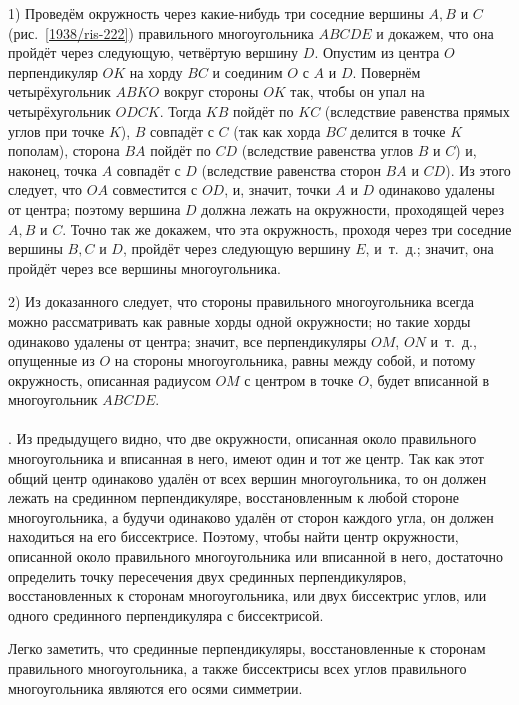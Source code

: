 1) Проведём окружность через какие-нибудь три соседние вершины $A, B$ и $C$ (рис.~\ref{1938/ris-222}) правильного многоугольника $ABCDE$ и докажем, что она пройдёт через следующую, четвёртую вершину $D$.
Опустим из центра $O$ перпендикуляр $OK$ на хорду $BC$ и соединим $O$ с $A$ и $D$.
Повернём четырёхугольник $ABKO$ вокруг стороны $OK$ так, чтобы он упал на четырёхугольник $ODCK$.
Тогда $KB$ пойдёт по $KC$ (вследствие равенства прямых углов при точке $K$), 
$B$ совпадёт с $C$ (так как хорда $BC$ делится в точке $K$ пополам), 
сторона $BA$ пойдёт по $CD$ (вследствие равенства углов $B$ и $C$)
и, наконец, точка $A$ совпадёт с $D$ (вследствие равенства сторон $BA$ и $CD$).
Из этого следует, что $OA$ совместится с $OD$, и, значит, точки $A$ и $D$ одинаково удалены от центра;
поэтому вершина $D$ должна лежать на окружности, проходящей через $A, B$ и $C$.
Точно так же докажем, что эта окружность, проходя через три соседние вершины $B, C$ и $D$, пройдёт через следующую вершину $E$, и~т.~д.;
значит, она пройдёт через все вершины многоугольника.

2) Из доказанного следует, что стороны правильного многоугольника всегда можно рассматривать как равные хорды одной окружности;
но такие хорды одинаково удалены от центра;
значит, все перпендикуляры $OM$, $ON$ и~т.~д., опущенные из $O$ на стороны многоугольника, равны между собой, и потому окружность, описанная радиусом $OM$ с центром в точке $O$, будет вписанной в многоугольник $ABCDE$.

\paragraph{}\label{1938/216}
.
Из предыдущего видно, что две окружности, описанная около правильного многоугольника и вписанная в него, имеют один и тот же центр.
Так как этот общий центр одинаково удалён от всех вершин многоугольника, то он должен лежать на срединном перпендикуляре, восстановленным к любой стороне многоугольника, а будучи одинаково удалён от сторон каждого угла, он должен находиться на его биссектрисе.
Поэтому, чтобы найти центр окружности, описанной около правильного многоугольника или вписанной в него, достаточно определить точку пересечения двух срединных перпендикуляров, восстановленных к сторонам многоугольника, или двух биссектрис углов, или одного срединного перпендикуляра с биссектрисой.

Легко заметить, что срединные перпендикуляры, восстановленные к сторонам правильного многоугольника, а также биссектрисы всех углов правильного многоугольника являются его осями симметрии.

